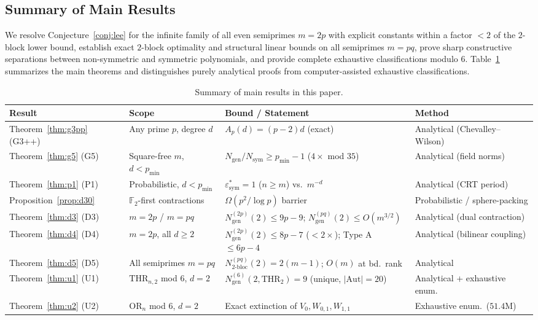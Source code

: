 \documentclass[11pt,a4paper]{article}
\theoremstyle{definition}
\newcommand{\F}{\mathbb{F}}
\newcommand{\OR}{\mathrm{OR}}
\newcommand{\THR}{\mathrm{THR}}
\newcommand{\Nsym}{N_{\mathrm{sym}}}
\newcommand{\Ngen}{N_{\mathrm{gen}}}
\newcommand{\Ntwobloc}{N_{\mathrm{2\text{-}bloc}}}
\newcommand{\Aut}{\mathrm{Aut}}
\begin{document}
\subsection{Summary of Main Results}

We resolve Conjecture~\ref{conj:lee} for the infinite family of all even semiprimes $m = 2p$ with explicit constants within a factor $< 2$ of the $2$-block lower bound, establish exact $2$-block optimality and structural linear bounds on all semiprimes $m = pq$, prove sharp constructive separations between non-symmetric and symmetric polynomials, and provide complete exhaustive classifications modulo $6$. Table~\ref{tab:summary} summarizes the main theorems and distinguishes purely analytical proofs from computer-assisted exhaustive classifications.

\begin{table}[ht]
\centering
\small
\begin{tabular}{@{}llll@{}}
\toprule
\textbf{Result} & \textbf{Scope} & \textbf{Bound / Statement} & \textbf{Method} \\
\midrule
Theorem~\ref{thm:g3pp} (G3++) & Any prime $p$, degree $d$ & $A_p(d) = (p-2)d$ (exact) & Analytical (Chevalley--Wilson) \\
Theorem~\ref{thm:g5} (G5) & Square-free $m$, $d < p_{\min}$ & $\Ngen/\Nsym \ge p_{\min}-1$ ($4\times$ mod $35$) & Analytical (field norms) \\
Theorem~\ref{thm:p1} (P1) & Probabilistic, $d < p_{\min}$ & $\varepsilon_{\mathrm{sym}}^* = 1$ ($n \ge m$) vs.\ $m^{-d}$ & Analytical (CRT period) \\
Proposition~\ref{prop:d30} & $\F_2$-first contractions & $\Omega(p^2 / \log p)$ barrier & Probabilistic / sphere-packing \\
Theorem~\ref{thm:d3} (D3) & $m = 2p$ / $m = pq$ & $\Ngen^{(2p)}(2) \le 9p-9$; $\Ngen^{(pq)}(2) \le O(m^{3/2})$ & Analytical (dual contraction) \\
Theorem~\ref{thm:d4} (D4) & $m = 2p$, all $d \ge 2$ & $\Ngen^{(2p)}(2) \le 8p-7$ ($< 2\times$); Type A $\le 6p-4$ & Analytical (bilinear coupling) \\
Theorem~\ref{thm:d5} (D5) & All semiprimes $m = pq$ & $\Ntwobloc^{(pq)}(2) = 2(m-1)$; $O(m)$ at bd.\ rank & Analytical \\
Theorem~\ref{thm:u1} (U1) & $\THR_{n,2}$ mod $6$, $d=2$ & $\Ngen^{(6)}(2, \THR_2) = 9$ (unique, $|\Aut|=20$) & Analytical + exhaustive enum. \\
Theorem~\ref{thm:u2} (U2) & $\OR_n$ mod $6$, $d=2$ & Exact extinction of $V_0, W_{0,1}, W_{1,1}$ & Exhaustive enum.\ ($51.4\text{M}$) \\
\bottomrule
\end{tabular}
\caption{Summary of main results in this paper.}
\label{tab:summary}
\end{table}
\end{document}
